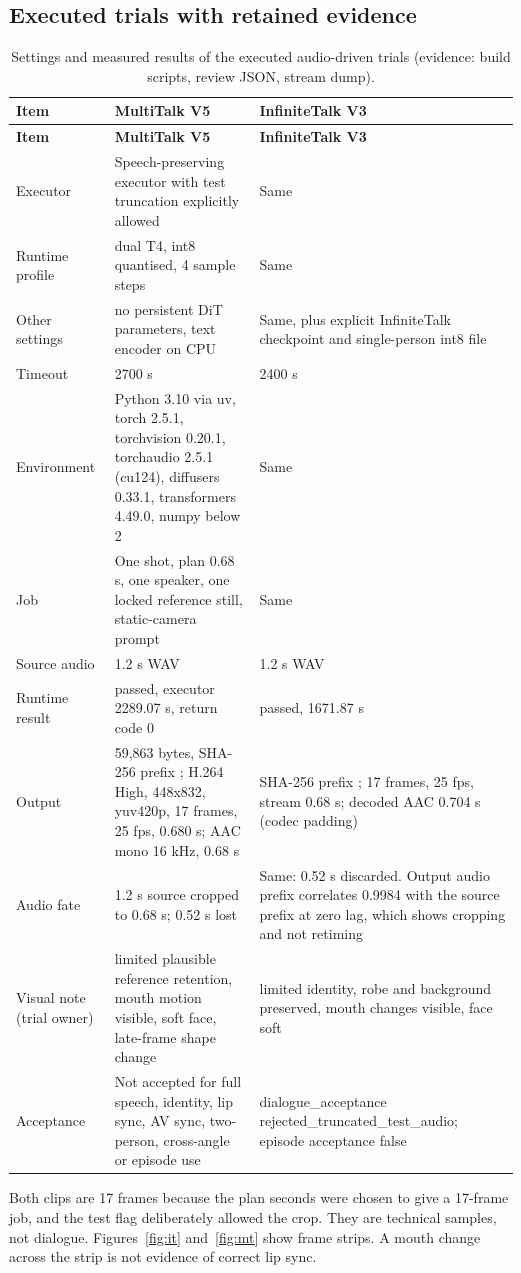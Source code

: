 \documentclass[11pt,a4paper]{article}
\newcommand{\code}[1]{\texttt{\detokenize{#1}}}
\begin{document}
\subsection{Executed trials with retained evidence}
\begin{longtable}{@{}P{3.0cm}P{6.2cm}P{6.3cm}@{}}
\caption{Settings and measured results of the executed audio-driven trials (evidence: build scripts, review JSON, stream dump).}\\
\toprule \textbf{Item} & \textbf{MultiTalk V5} & \textbf{InfiniteTalk V3}\\ \midrule\endfirsthead
\toprule \textbf{Item} & \textbf{MultiTalk V5} & \textbf{InfiniteTalk V3}\\ \midrule\endhead
Executor & Speech-preserving executor with test truncation explicitly allowed & Same\\
Runtime profile & dual T4, int8 quantised, 4 sample steps & Same\\
Other settings & no persistent DiT parameters, text encoder on CPU & Same, plus explicit InfiniteTalk checkpoint and single-person int8 file\\
Timeout & 2700 s & 2400 s\\
Environment & Python 3.10 via uv, torch 2.5.1, torchvision 0.20.1, torchaudio 2.5.1 (cu124), diffusers 0.33.1, transformers 4.49.0, numpy below 2 & Same\\
Job & One shot, plan 0.68 s, one speaker, one locked reference still, static-camera prompt & Same\\
Source audio & 1.2 s WAV & 1.2 s WAV\\
Runtime result & passed, executor 2289.07 s, return code 0 & passed, 1671.87 s\\
Output & 59,863 bytes, SHA-256 prefix \code{fa52515c}; H.264 High, 448x832, yuv420p, 17 frames, 25 fps, 0.680 s; AAC mono 16 kHz, 0.68 s & SHA-256 prefix \code{2e9cce67}; 17 frames, 25 fps, stream 0.68 s; decoded AAC 0.704 s (codec padding)\\
Audio fate & 1.2 s source cropped to 0.68 s; 0.52 s lost & Same: 0.52 s discarded. Output audio prefix correlates 0.9984 with the source prefix at zero lag, which shows cropping and not retiming\\
Visual note (trial owner) & limited plausible reference retention, mouth motion visible, soft face, late-frame shape change & limited identity, robe and background preserved, mouth changes visible, face soft\\
Acceptance & Not accepted for full speech, identity, lip sync, AV sync, two-person, cross-angle or episode use & dialogue\_acceptance rejected\_truncated\_test\_audio; episode acceptance false\\
\bottomrule
\end{longtable}
Both clips are 17 frames because the plan seconds were chosen to give a 17-frame job, and the test flag deliberately allowed the crop. They are technical samples, not dialogue. Figures~\ref{fig:it} and~\ref{fig:mt} show frame strips. A mouth change across the strip is not evidence of correct lip sync.
\end{document}
